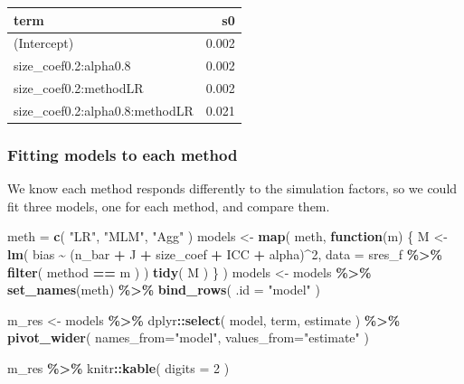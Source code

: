 \documentclass[
]{book}
\newenvironment{Shaded}{\begin{snugshade}}{\end{snugshade}}
\newcommand{\AttributeTok}[1]{\textcolor[rgb]{0.13,0.29,0.53}{#1}}
\newcommand{\ControlFlowTok}[1]{\textcolor[rgb]{0.13,0.29,0.53}{\textbf{#1}}}
\newcommand{\DecValTok}[1]{\textcolor[rgb]{0.00,0.00,0.81}{#1}}
\newcommand{\FunctionTok}[1]{\textcolor[rgb]{0.13,0.29,0.53}{\textbf{#1}}}
\newcommand{\NormalTok}[1]{#1}
\newcommand{\OtherTok}[1]{\textcolor[rgb]{0.56,0.35,0.01}{#1}}
\newcommand{\SpecialCharTok}[1]{\textcolor[rgb]{0.81,0.36,0.00}{\textbf{#1}}}
\newcommand{\StringTok}[1]{\textcolor[rgb]{0.31,0.60,0.02}{#1}}
\begin{document}
\begin{tabular}{l|r}
\hline
term & s0\\
\hline
(Intercept) & 0.002\\
\hline
size\_coef0.2:alpha0.8 & 0.002\\
\hline
size\_coef0.2:methodLR & 0.002\\
\hline
size\_coef0.2:alpha0.8:methodLR & 0.021\\
\hline
\end{tabular}

\subsubsection{Fitting models to each method}\label{fitting-models-to-each-method}

We know each method responds differently to the simulation factors, so we could fit three models, one for each method, and compare them.

\begin{Shaded}
\begin{Highlighting}[]
\NormalTok{meth }\OtherTok{=} \FunctionTok{c}\NormalTok{( }\StringTok{"LR"}\NormalTok{, }\StringTok{"MLM"}\NormalTok{, }\StringTok{"Agg"}\NormalTok{ )}
\NormalTok{models }\OtherTok{\textless{}{-}} \FunctionTok{map}\NormalTok{( meth, }\ControlFlowTok{function}\NormalTok{(m) \{}
\NormalTok{  M }\OtherTok{\textless{}{-}} \FunctionTok{lm}\NormalTok{( bias }\SpecialCharTok{\textasciitilde{}}\NormalTok{ (n\_bar }\SpecialCharTok{+}\NormalTok{ J }\SpecialCharTok{+}\NormalTok{ size\_coef }\SpecialCharTok{+}\NormalTok{ ICC }\SpecialCharTok{+}\NormalTok{ alpha)}\SpecialCharTok{\^{}}\DecValTok{2}\NormalTok{, }
      \AttributeTok{data =}\NormalTok{ sres\_f }\SpecialCharTok{\%\textgreater{}\%} \FunctionTok{filter}\NormalTok{( method }\SpecialCharTok{==}\NormalTok{ m ) )}
  \FunctionTok{tidy}\NormalTok{( M )}
\NormalTok{\} )}
\NormalTok{models }\OtherTok{\textless{}{-}}\NormalTok{ models }\SpecialCharTok{\%\textgreater{}\%} \FunctionTok{set\_names}\NormalTok{(meth) }\SpecialCharTok{\%\textgreater{}\%} 
  \FunctionTok{bind\_rows}\NormalTok{( }\AttributeTok{.id =} \StringTok{"model"}\NormalTok{ )}

\NormalTok{m\_res }\OtherTok{\textless{}{-}}\NormalTok{ models }\SpecialCharTok{\%\textgreater{}\%} 
\NormalTok{  dplyr}\SpecialCharTok{::}\FunctionTok{select}\NormalTok{( model, term, estimate ) }\SpecialCharTok{\%\textgreater{}\%}
  \FunctionTok{pivot\_wider}\NormalTok{( }\AttributeTok{names\_from=}\StringTok{"model"}\NormalTok{, }\AttributeTok{values\_from=}\StringTok{"estimate"}\NormalTok{ )}

\NormalTok{m\_res }\SpecialCharTok{\%\textgreater{}\%}
\NormalTok{  knitr}\SpecialCharTok{::}\FunctionTok{kable}\NormalTok{( }\AttributeTok{digits =} \DecValTok{2}\NormalTok{ )}
\end{Highlighting}
\end{Shaded}
\end{document}

